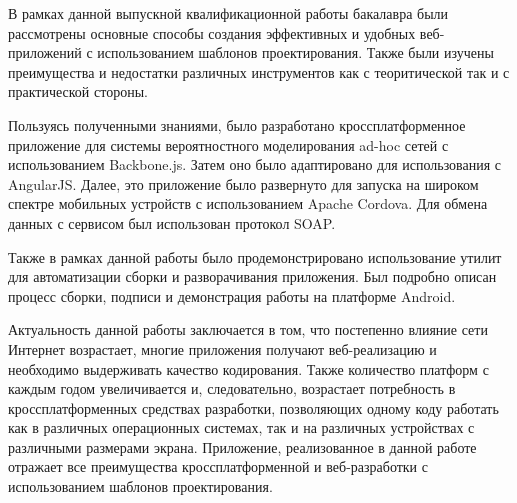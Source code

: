 
В рамках данной выпускной квалификационной работы бакалавра были рассмотрены основные способы создания эффективных и удобных веб-приложений с использованием шаблонов проектирования. Также были изучены преимущества и недостатки различных инструментов как с теоритической так и с практической стороны.

Пользуясь полученными знаниями, было разработано кроссплатформенное приложение для системы вероятностного моделирования ad-hoc сетей с использованием Backbone.js. Затем оно было адаптировано для использования с AngularJS. Далее, это приложение было развернуто для запуска на широком спектре мобильных устройств с использованием Apache Cordova. Для обмена данных с сервисом был использован протокол SOAP.

Также в рамках данной работы было продемонстрировано использование утилит для автоматизации сборки и разворачивания приложения. Был подробно описан процесс сборки, подписи и демонстрация работы на платформе Android.

Актуальность данной работы заключается в том, что постепенно влияние сети Интернет возрастает, многие приложения получают веб-реализацию и необходимо выдерживать качество кодирования. Также количество платформ с каждым годом увеличивается и, следовательно, возрастает потребность в кроссплатформенных средствах разработки, позволяющих одному коду работать как в различных операционных системах, так и на различных устройствах с различными размерами экрана. Приложение, реализованное в данной работе отражает все преимущества кроссплатформенной и веб-разработки с использованием шаблонов проектирования.